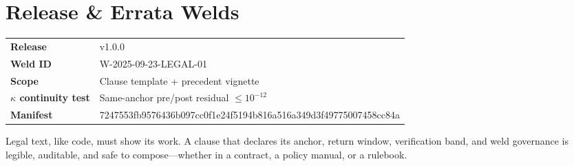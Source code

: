 \section{Release \& Errata Welds}
\label{sec:legal-releases}

\begin{eqbox}
\small
\begin{tabularx}{\linewidth}{@{}>{\bfseries}l >{\ttfamily}X@{}}
Release                    & v1.0.0 \\
Weld ID                    & W-2025-09-23-LEGAL-01 \\
Scope                      & Clause template + precedent vignette \\
\(\kappa\) continuity test & Same-anchor pre/post residual $\le 10^{-12}$ \\
Manifest                   & 7247553fb9576436b097cc0f1e24f5194b816a516a349d3f49775007458cc84a \\
\end{tabularx}
\end{eqbox}


\medskip
\noindent
Legal text, like code, must show its work. A clause that declares its anchor, return window, verification band, and weld governance is legible, auditable, and safe to compose—whether in a contract, a policy manual, or a rulebook.
